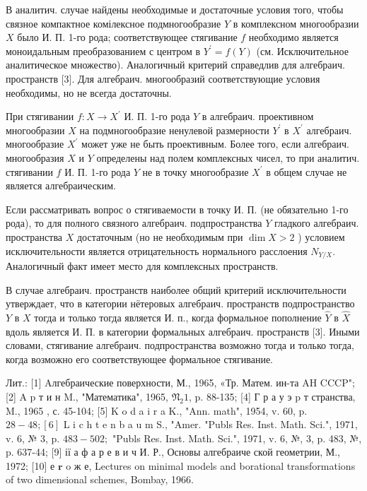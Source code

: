\documentclass[10pt]{article}
\begin{document}
В аналитич. случае найдены необходимые и достаточные условия того, чтобы связное компактное комілексное подмногообразие $Y$ в комплексном многообразии $X$ было И. П. 1-го рода; соответствующее стягивание $f$ необходимо является моноидальным преобразованием с центром в $Y^{\prime}=f(Y)$ (см. Исключительное аналитическое множество). Аналогичный критерий справедлив для алгебраич. пространств [3]. Для алгебраич. многообразий соответствующие условия необходимы, но не всегда достаточны.



При стягивании $f: X \rightarrow X^{\prime}$ И. П. 1-го рода $Y$ в алгебраич. проективном многообразии $X$ на подмногообразие ненулевой размерности $Y^{\prime}$ в $X^{\prime}$ алгебраич. многообразие $X^{\prime}$ может уже не быть проективным. Более того, если алгебраич. многообразия $X$ и $Y$ определены над полем комплексных чисел, то при аналитич. стягивании $f$ И. П. 1-го рода $Y$ не в точку многообразие $X^{\prime}$ в общем случае не является алгебраическим.



Если рассматривать вопрос о стягиваемости в точку И. П. (не обязательно 1-го рода), то для полного связного алгебраич. подпространства $Y$ гладкого алгебраич. пространства $X$ достаточным (но не необходимым при $\operatorname{dim} X>2$ ) условием исключительности является отрицательность нормального расслоения $N_{Y / X}$. Аналогичный факт имеет место для комплексных пространств.



В случае алгебраич. пространств наиболее общий критерий исключительности утверждает, что в категории нётеровых алгебраич. пространств подпространство $Y$ в $X$ тогда и только тогда является И. п., когда формальное пополнение $\hat{Y}$ в $\hat{X}$ вдоль является И. П. в категории формальных алгебраич. пространств [3]. Иными словами, стягивание алгебраич. подпространства возможно тогда и только тогда, когда возможно его соответствующее формальное стягивание.



Лит.: [1] Aлгебраические поверхности, М., 1965, «Тр. Матем. ин-та AH CCCP"; [2] A p т и н M., "Математика", 1965, $\mathfrak{N}_{2} 1$, p. 88-135; [4] Г р а у э p т странства, M., 1965 , с. 45-104; [5] K o d a i r a K., "Ann. math", 1954, v. 60, p. $28-48 ;[6]$ L i c h t e n b a u m S., "Amer. "Publs Res. Inst. Math. Sci.", 1971, v. 6, № 3, p. $483-502 ;$ "Publs Res. Inst. Math. Sci.", 1971, v. 6, №, 3, p. 483, №, p. 637-44; [9] ії а ф а р е в и ч И. Р., Основы алгебраиче ской геометрии, М., 1972; [10] е $\boldsymbol{r}$ o ж е, Lectures on minimal models and borational transformations of two dimensional schemes, Bombay, 1966.
\end{document}
